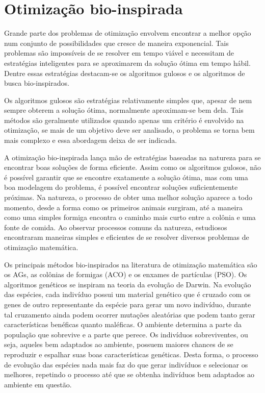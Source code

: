 \chapter[Otimização bio-inspirada]{Otimização bio-inspirada}

Grande parte dos problemas de otimização envolvem encontrar a melhor opção num conjunto de possibilidades que cresce de maneira exponencial. Tais problemas são impossíveis de se resolver em tempo viável e necessitam de estratégias inteligentes para se aproximarem da solução ótima em tempo hábil. Dentre essas estratégias destacam-se os algoritmos gulosos e os algoritmos de busca bio-inspirados.

Os algoritmos gulosos são estratégias relativamente simples que, apesar de nem sempre obterem a solução ótima, normalmente aproximam-se bem dela. Tais métodos são geralmente utilizados quando apenas um critério é envolvido na otimização, se mais de um objetivo deve ser analisado, o problema se torna bem mais complexo e essa abordagem deixa de ser indicada.

A otimização bio-inspirada lança mão de estratégias baseadas na natureza para se encontrar boas soluções de forma eficiente. Assim como os algoritmos gulosos, não é possível garantir que se encontre exatamente a solução ótima, mas com uma boa modelagem do problema, é possível encontrar soluções suficientemente próximas. Na natureza, o processo de obter uma melhor solução aparece a todo momento, desde a forma como os primeiros animais surgiram, até a maneira como uma simples formiga encontra o caminho mais curto entre a colônia e uma fonte de comida. Ao observar processos comuns da natureza, estudiosos encontraram maneiras simples e eficientes de se resolver diversos problemas de otimização matemática.

Os principais métodos bio-inspirados na literatura de otimização matemática são os \acp{AG}, as colônias de formigas (ACO) e os enxames de partículas (PSO). Os algoritmos genéticos se inspiram na teoria da evolução de Darwin. Na evolução das espécies, cada indivíduo possui um material genético que é cruzado com os genes de outro representante da espécie para gerar um novo indivíduo, durante tal cruzamento ainda podem ocorrer mutações aleatórias que podem tanto gerar características benéficas quanto maléficas. O ambiente determina a parte da população que sobrevive e a parte que perece. Os indivíduos sobreviventes, ou seja, aqueles bem adaptados ao ambiente, possuem maiores chances de se reproduzir e espalhar suas boas características genéticas. Desta forma, o processo de evolução das espécies nada mais faz do que gerar indivíduos e selecionar os melhores, repetindo o processo até que se obtenha indivíduos bem adaptados ao ambiente em questão. 

